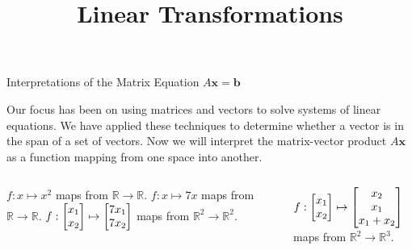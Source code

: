 \documentclass[xcolor=dvipsnames,aspectratio=169,t]{beamer}
\title{Linear Transformations}
\begin{document}
\maketitle

\begin{frame}{Interpretations of the Matrix Equation $A \mathbf{x}=\mathbf{b}$}

  \bi
  \ii Our focus has been on using matrices and vectors to solve systems of linear equations.
  \ii We have applied these techniques to determine whether a vector is in the span of a set of vectors.
  \ii Now we will interpret the matrix-vector product $A \mathbf{x}$ as a \alert{function mapping from one space into another.}
  \ei
  \bigskip
  
  \pause
  \begin{example}

    \begin{columns}[T]
      \column{0.475\tw}
    \bi
    \ii $f: x \mapsto x^2$ maps from $\mathbb{R} \to \mathbb{R}$. \medskip
    \ii $f: x \mapsto 7x$   maps from $\mathbb{R} \to \mathbb{R}$.\medskip
     \ii $\displaystyle f: \begin{bmatrix} x_1 \\ x_2 \end{bmatrix} \mapsto \begin{bmatrix} 7x_1\\  7x_2 \end{bmatrix}$ maps from $\mathbb{R}^2 \to \mathbb{R}^2$.
    \ei

    \column{0.525\tw}
    \bi
    \ii $\displaystyle f: \begin{bmatrix} x_1 \\ x_2 \end{bmatrix} \mapsto \begin{bmatrix} x_2 \\ x_1 \\ x_1 + x_2 \end{bmatrix}$ maps from $\mathbb{R}^2 \to \mathbb{R}^3$. \ms
    \ei
    \end{columns}
  \end{example}

  \end{frame}
\end{document}

